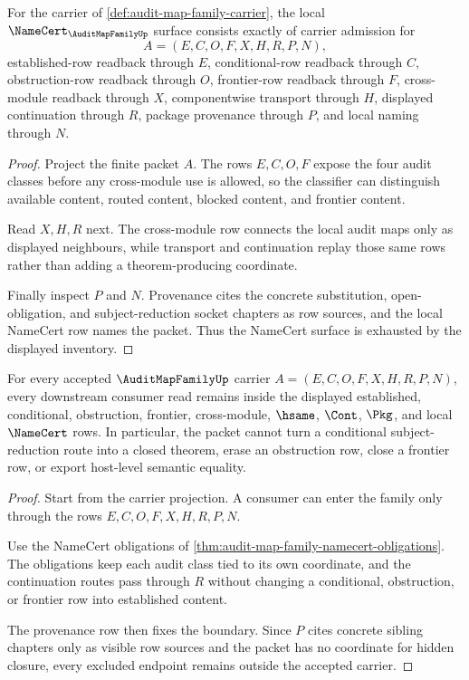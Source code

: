 \begin{theorem}
\label{thm:audit-map-family-namecert-obligations}
For the carrier of \autoref{def:audit-map-family-carrier}, the local $\NameCert_{\AuditMapFamilyUp}$ surface consists exactly of carrier admission for
$$
A=(E,C,O,F,X,H,R,P,N),
$$
established-row readback through $E$, conditional-row readback through $C$, obstruction-row readback through $O$, frontier-row readback through $F$, cross-module readback through $X$, componentwise transport through $H$, displayed continuation through $R$, package provenance through $P$, and local naming through $N$.
\end{theorem}
\begin{proof}
Project the finite packet $A$. The rows $E,C,O,F$ expose the four audit classes before any cross-module use is allowed, so the classifier can distinguish available content, routed content, blocked content, and frontier content.

Read $X,H,R$ next. The cross-module row connects the local audit maps only as displayed neighbours, while transport and continuation replay those same rows rather than adding a theorem-producing coordinate.

Finally inspect $P$ and $N$. Provenance cites the concrete substitution, open-obligation, and subject-reduction socket chapters as row sources, and the local NameCert row names the packet. Thus the NameCert surface is exhausted by the displayed inventory.
\end{proof}

\begin{theorem}
\label{thm:audit-map-family-boundary-nonescape}
For every accepted $\AuditMapFamilyUp$ carrier $A=(E,C,O,F,X,H,R,P,N)$, every downstream consumer read remains inside the displayed established, conditional, obstruction, frontier, cross-module, $\hsame$, $\Cont$, $\Pkg$, and local $\NameCert$ rows. In particular, the packet cannot turn a conditional subject-reduction route into a closed theorem, erase an obstruction row, close a frontier row, or export host-level semantic equality.
\end{theorem}
\begin{proof}
Start from the carrier projection. A consumer can enter the family only through the rows $E,C,O,F,X,H,R,P,N$.

Use the NameCert obligations of \autoref{thm:audit-map-family-namecert-obligations}. The obligations keep each audit class tied to its own coordinate, and the continuation routes pass through $R$ without changing a conditional, obstruction, or frontier row into established content.

The provenance row then fixes the boundary. Since $P$ cites concrete sibling chapters only as visible row sources and the packet has no coordinate for hidden closure, every excluded endpoint remains outside the accepted carrier.
\end{proof}

